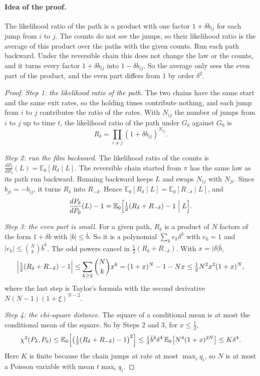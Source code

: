 \documentclass[11pt]{article}
\theoremstyle{definition}
\theoremstyle{remark}
\newcommand{\E}{\mathbb E}
\begin{document}
\paragraph{Idea of the proof.} The likelihood ratio of the path is a product
with one factor $1+\delta b_{ij}$ for each jump from $i$ to $j$. The counts do
not see the jumps, so their likelihood ratio is the average of this product
over the paths with the given counts. Run each path backward. Under the
reversible chain this does not change the law or the counts, and it turns every
factor $1+\delta b_{ij}$ into $1-\delta b_{ij}$. So the average only sees the
even part of the product, and the even part differs from $1$ by order
$\delta^2$.

\begin{proof}
\emph{Step 1: the likelihood ratio of the path.} The two chains have the same
start and the same exit rates, so the holding times contribute nothing, and
each jump from $i$ to $j$ contributes the ratio of the rates. With $N_{ij}$
the number of jumps from $i$ to $j$ up to time $t$, the likelihood ratio of
the path under $G_\delta$ against $G_0$ is
\[
 R_\delta=\prod_{i\ne j}(1+\delta b_{ij})^{N_{ij}} .
\]

\emph{Step 2: run the film backward.} The likelihood ratio of the counts is
$\frac{dP_\delta}{dP_0}(L)=\E_0[R_\delta\mid L]$. The reversible chain
started from $\pi$ has the same law as its path run backward. Running backward
keeps $L$ and swaps $N_{ij}$ with $N_{ji}$. Since $b_{ji}=-b_{ij}$, it turns
$R_\delta$ into $R_{-\delta}$. Hence
$\E_0[R_\delta\mid L]=\E_0[R_{-\delta}\mid L]$, and
\[
 \frac{dP_\delta}{dP_0}(L)-1
 =\E_0\Bigl[\tfrac12(R_\delta+R_{-\delta})-1\Bigm|L\Bigr].
\]

\emph{Step 3: the even part is small.} For a given path, $R_\delta$ is a
product of $N$ factors of the form $1+\delta b$ with $\lvert b\rvert\le\bar b$.
So it is a polynomial $\sum_ke_k\delta^k$ with $e_0=1$ and
$\lvert e_k\rvert\le\binom Nk\bar b^k$. The odd powers cancel in
$\frac12(R_\delta+R_{-\delta})$. With $x=\lvert\delta\rvert\bar b$,
\[
 \Bigl\lvert\tfrac12(R_\delta+R_{-\delta})-1\Bigr\rvert
 \le\sum_{k\ge2}\binom Nkx^k=(1+x)^N-1-Nx\le\tfrac12N^2x^2(1+x)^N ,
\]
where the last step is Taylor's formula with the second derivative
$N(N-1)(1+\xi)^{N-2}$.

\emph{Step 4: the chi-square distance.} The square of a conditional mean is at
most the conditional mean of the square. So by Steps 2 and 3, for
$x\le\frac12$,
\[
 \chi^2(P_\delta,P_0)
 \le\E_0\Bigl[\bigl(\tfrac12(R_\delta+R_{-\delta})-1\bigr)^2\Bigr]
 \le\tfrac14\bar b^4\delta^4\,\E_0\bigl[N^4(1+x)^{2N}\bigr]\le K\delta^4 .
\]
Here $K$ is finite because the chain jumps at rate at most $\max_iq_i$, so $N$
is at most a Poisson variable with mean $t\max_iq_i$.


\end{proof}
\end{document}
